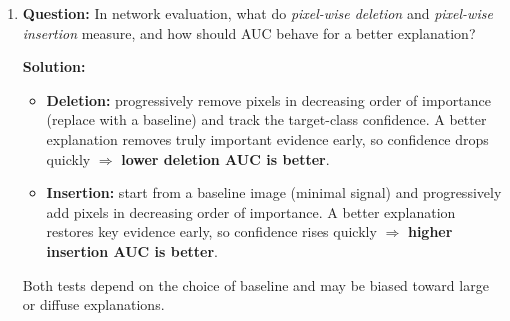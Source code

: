 \documentclass{article}
\begin{document}
\begin{enumerate}
\item \textbf{Question:}  
In network evaluation, what do \emph{pixel-wise deletion} and \emph{pixel-wise insertion} measure, and how should AUC behave for a better explanation?

\textbf{Solution:}  
\begin{itemize}
    \item \textbf{Deletion:} progressively remove pixels in decreasing order of importance (replace with a baseline) and track the target-class confidence. A better explanation removes truly important evidence early, so confidence drops quickly $\Rightarrow$ \textbf{lower deletion AUC is better}.
    \item \textbf{Insertion:} start from a baseline image (minimal signal) and progressively add pixels in decreasing order of importance. A better explanation restores key evidence early, so confidence rises quickly $\Rightarrow$ \textbf{higher insertion AUC is better}.
\end{itemize}
Both tests depend on the choice of baseline and may be biased toward large or diffuse explanations.
\end{enumerate}
\end{document}
